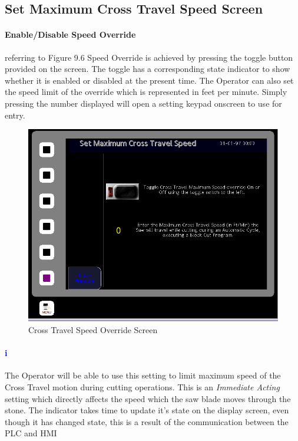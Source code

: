 \subsection{Set Maximum Cross Travel Speed Screen}\paragraph*{Enable/Disable Speed Override}referring to Figure 9.6 Speed Override is achieved by pressing the toggle button provided on the screen. The toggle has a corresponding state indicator to show whether it is enabled or disabled at the present time. The Operator can also set the speed limit of the override which is represented in feet per minute. Simply pressing the number displayed will open a setting keypad onscreen to use for entry.
\begin{figure}
	\centering
	\includegraphics[width=.8\linewidth]{screen-captures/program/global_speed}
	\caption{Cross Travel Speed Override Screen}
	\label{fig:global_speed}
\end{figure}
\paragraph{\textbf{\LARGE \textcolor{blue}{i}}}The Operator will be able to use this setting to limit maximum speed of the Cross Travel motion during cutting operations. This is an \textit{Immediate Acting} setting which directly affects the speed which the saw blade moves through the stone. The indicator takes time to update it's state on the display screen, even though it has changed state, this is a result of the communication between the PLC and HMI